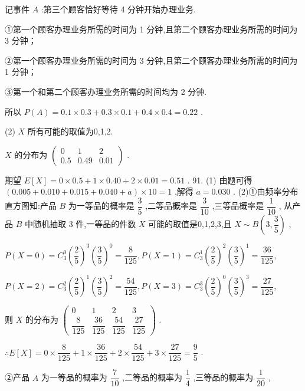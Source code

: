 记事件 $A$ :第三个顾客恰好等待 4 分钟开始办理业务.

①第一个顾客办理业务所需的时间为 1 分钟,且第二个顾客办理业务所需的时间为 3 分钟；

②第一个顾客办理业务所需的时间为 3 分钟,且第二个顾客办理业务所需的时间为 1 分钟；

③第一个和第二个顾客办理业务所需的时间均为 2 分钟.

所以 $P\left( A\right)  = {0.1} \times  {0.3} + {0.3} \times  {0.1} + {0.4} \times  {0.4} = {0.22}$ .

(2) $X$ 所有可能的取值为0,1,2.

$X$ 的分布为 $\left( \begin{matrix} 0 & 1 & 2 \\  {0.5} & {0.49} & {0.01} \end{matrix}\right)$ .

期望 $E\left\lbrack  X\right\rbrack   = 0 \times  {0.5} + 1 \times  {0.40} + 2 \times  {0.01} = {0.51}$ . 91. (1) 由题可得 $\left( {{0.005} + {0.010} + {0.015} + {0.040} + a}\right)  \times  {10} = 1$ ,解得 $a = {0.030}$ . (2)①由频率分布直方图知:产品 $B$ 为一等品的概率是 $\dfrac{3}{5}$ ,二等品概率是 $\dfrac{3}{10}$ ,三等品概率是 $\dfrac{1}{10}$ , 从产品 $B$ 中随机抽取 3 件,一等品的件数 $X$ 可能的取值是0,1,2,3,且 $X \sim  B\left( {3,\dfrac{3}{5}}\right)$ ,

$P\left( {X = 0}\right)  = {C}_{3}^{0}{\left( \dfrac{2}{5}\right) }^{3}{\left( \dfrac{3}{5}\right) }^{0} = \dfrac{8}{125},P\left( {X = 1}\right)  = {C}_{3}^{1}{\left( \dfrac{2}{5}\right) }^{2}{\left( \dfrac{3}{5}\right) }^{1} = \dfrac{36}{125},$

$P\left( {X = 2}\right)  = {C}_{3}^{2}{\left( \dfrac{2}{5}\right) }^{1}{\left( \dfrac{3}{5}\right) }^{2} = \dfrac{54}{125},P\left( {X = 3}\right)  = {C}_{3}^{3}{\left( \dfrac{2}{5}\right) }^{0}{\left( \dfrac{3}{5}\right) }^{3} = \dfrac{27}{125},$

则 $X$ 的分布为 $\left( \begin{matrix} 0 & 1 & 2 & 3 \\  \dfrac{8}{125} & \dfrac{36}{125} & \dfrac{54}{125} & \dfrac{27}{125} \end{matrix}\right)$ .

$\therefore E\left\lbrack  X\right\rbrack   = 0 \times  \dfrac{8}{125} + 1 \times  \dfrac{36}{125} + 2 \times  \dfrac{54}{125} + 3 \times  \dfrac{27}{125} = \dfrac{9}{5}$ .

②产品 $A$ 为一等品的概率为 $\dfrac{7}{10}$ ,二等品的概率为 $\dfrac{1}{4}$ ,三等品的概率为 $\dfrac{1}{20}$ ,

